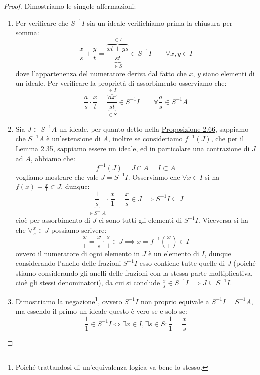 \documentclass[11pt]{scrartcl}
\begin{document}
\begin{proof}
    Dimostriamo le singole affermazioni:
    \begin{enumerate}[(1)]
        \item Per verificare che $S^{-1}I$ sia un ideale verifichiamo prima la chiusura per somma:
            \[ \frac{x}{s} + \frac{y}{t} = \frac{\overbrace{xt + ys}^{\in I}}{\underbrace{st}_{\in S}} \in S^{-1}I \qquad \forall x,y \in I
                \]
            dove l'appartenenza del numeratore deriva dal fatto che $x$, $y$ siano elementi di un ideale. Per verificare la proprietà di assorbimento osserviamo che:
            \[ \frac{a}{s} \cdot \frac{x}{t} = \frac{\overbrace{ax}^{\in I}}{\underbrace{st}_{\in S}} \in S^{-1}I \qquad \forall \frac{a}{s} \in S^{-1}A 
                 \]
        \item Sia $J \subset S^{-1}A$ un ideale, per quanto detto nella \hyperref[2.66]{Proposizione 2.66}, sappiamo che $S^{-1}A$ è un'estensione di $A$, inoltre se consideriamo $f^{-1}(J)$, che per il \hyperref[2.35]{Lemma 2.35}, 
            sappiamo essere un ideale, ed in particolare una contrazione di $J$ ad $A$, abbiamo che:
            \[ f^{-1}(J) = J \cap A = I \subset A
                \]
            vogliamo mostrare che vale $J = S^{-1}I$. Osserviamo che $\forall x \in I$ si ha $\displaystyle f(x) = \frac{x}{1} \in J$, dunque:
            \[ \underbrace{\frac{1}{s}}_{\in S^{-1}A} \cdot \frac{x}{1} = \frac{x}{s} \in J \implies S^{-1}I \subseteq J
                \]
            cioè per assorbimento di $J$ ci sono tutti gli elementi di $S^{-1}I$. Viceversa si ha che $\displaystyle\forall \frac{x}{s} \in J$ possiamo scrivere:
            \[ \frac{x}{1} = \frac{x}{s}\cdot \frac{s}{1} \in J \implies x = f^{-1}\left(\frac{x}{1}\right) \in I
                \]
            ovvero il numeratore di ogni elemento in $J$ è un elemento di $I$, dunque considerando l'anello delle frazioni $S^{-1}I$ esso contiene tutte quelle di $J$ (poiché stiamo considerando gli anelli delle frazioni con la stessa parte
            moltiplicativa, cioè gli stessi denominatori), da cui si conclude $\displaystyle \frac{x}{s} \in S^{-1}I \implies J \subseteq S^{-1}I$.
        \item Dimostriamo la negazione\footnote{Poiché trattandosi di un'equivalenza logica va bene lo stesso.}, ovvero $S^{-1}I$ non proprio equivale a $S^{-1}I = S^{-1}A$, ma essendo il primo un ideale questo è vero se e solo se:
            \[ \frac{1}{1} \in S^{-1}I \iff \exists x \in I, \exists s \in S : \frac{1}{1} = \frac{x}{s}
                \]

\end{enumerate}
\end{proof}
\end{document}
